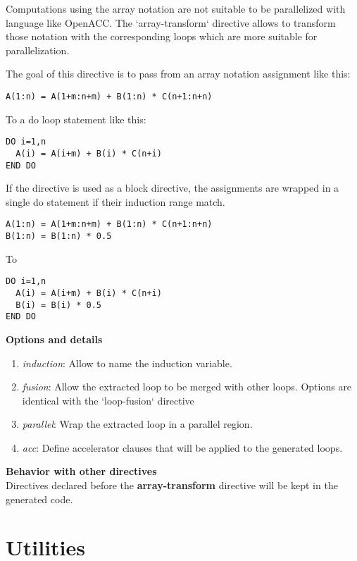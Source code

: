 \documentclass{article}
\begin{document}
Computations using the array notation are not suitable to be parallelized with
language like OpenACC. The `array-transform` directive allows to transform those
notation with the corresponding loops which are more suitable for
parallelization.

The goal of this directive is to pass from an array notation assignment like
this:

\begin{lstlisting}
A(1:n) = A(1+m:n+m) + B(1:n) * C(n+1:n+n)
\end{lstlisting}

To a do loop statement like this:

\begin{lstlisting}
DO i=1,n
  A(i) = A(i+m) + B(i) * C(n+i)
END DO
\end{lstlisting}

If the directive is used as a block directive, the assignments are wrapped in
a single do statement if their induction range match.

\begin{lstlisting}
A(1:n) = A(1+m:n+m) + B(1:n) * C(n+1:n+n)
B(1:n) = B(1:n) * 0.5
\end{lstlisting}

To

\begin{lstlisting}
DO i=1,n
  A(i) = A(i+m) + B(i) * C(n+i)
  B(i) = B(i) * 0.5
END DO
\end{lstlisting}


\textbf{Options and details}
\begin{enumerate}
\item \textit{induction}: Allow to name the induction variable.
\item \textit{fusion}: Allow the extracted loop to be merged with other loops. Options 
are identical with the `loop-fusion` directive
\item \textit{parallel}: Wrap the extracted loop in a parallel region.
\item \textit{acc}: Define accelerator clauses that will be applied to the generated loops.
\end{enumerate}

\textbf{Behavior with other directives}\\
Directives declared before the \textbf{array-transform} directive will be kept in the
generated code.

\section{Utilities}
\end{document}
